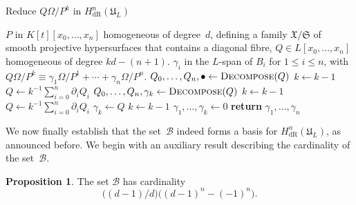 \documentclass[a4paper,11pt]{article}
\numberwithin{equation}{section}
\providecommand{\HdR}{H_{\text{dR}}}    %
\providecommand{\cB}{\mathcal{B}} %
\theoremstyle{definition}
\newtheorem{prop}[thm]{Proposition}
\begin{document}
\begin{algorithm}
\caption{Reduce $Q \Omega / P^k$ in $\HdR^n(\mathfrak{U}_L)$}
\label{alg:PoleRed}
\begin{algorithmic}
\vspace{1mm}
\Require  $P$ in $K[t][x_0, \dotsc, x_n]$ homogeneous of degree~$d$, 
         defining a family $\mathfrak{X}/\mathfrak{S}$ of smooth projective 
         hypersurfaces that contains a diagonal fibre, $Q \in L[x_0, \dotsc, x_n]$ 
         homogeneous of degree $kd - (n+1)$.
\Ensure  $\gamma_i$ in the $L$-span of $B_i$ for $1 \leq i \leq n$, with  
         $Q \Omega / P^k \equiv \gamma_{1} \Omega / P^{1} + \dotsb + \gamma_n \Omega / P^n$.
\State $Q_0, \dotsc, Q_n, \bullet \gets \Call{Decompose}{Q}$
\State $k \gets k-1$
\State $Q \gets k^{-1} \sum_{i=0}^n \partial_i Q_i$
\EndWhile
{}
\State $Q_0, \dotsc, Q_n, \gamma_k \gets \Call{Decompose}{Q}$
\State $k \gets k-1$
\State $Q \gets k^{-1} \sum_{i=0}^n \partial_i Q_i$
\EndWhile
{}
\State $\gamma_{k} \gets Q$
\State $k \gets k-1$
\EndIf
\State $\gamma_{1}, \dotsc, \gamma_{k} \gets 0$
\State \textbf{return} $\gamma_{1}, \dotsc, \gamma_n$
\EndProcedure
\end{algorithmic}
\end{algorithm}

We now finally establish that the set~$\cB$ indeed forms a basis for 
$\HdR^n(\mathfrak{U}_L)$, as announced before.  We begin with an 
auxiliary result describing the cardinality of the set~$\cB$.

\begin{prop} \label{prop:BasisSize}
The set $\cB$ has cardinality
\begin{equation}
\bigl((d-1)/d\bigr) \bigl((d-1)^{n} - (-1)^{n}\bigr).
\end{equation}
\end{prop}
\end{document}
